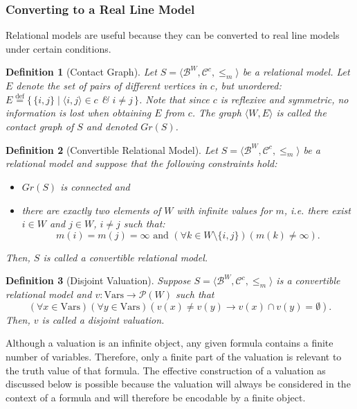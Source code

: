 \documentclass{article}
\newtheorem*{definition}{Definition}
\newcommand{\pwrset}{\mathcal{P}}
\newcommand{\B}{\mathcal{B}}
\newcommand{\Vars}{\text{Vars}}
\newcommand{\eqdef}{\stackrel{\text{def}}{=}}
\begin{document}
\subsubsection{Converting to a Real Line Model}
Relational models are useful because they can be converted to real line models under certain conditions.
\begin{definition}[Contact Graph]
  Let $S = \langle \B^W, \mathcal{C}^c, \leq_m \rangle$ be a relational model. Let $E$ denote the set of pairs of different vertices in $c$, but unordered: $E \eqdef \{\, \{i, j\} \mid \langle i, j \rangle \in c$ \& $i \neq j \,\}$. Note that since $c$ is reflexive and symmetric, no information is lost when obtaining $E$ from $c$.
  The graph $\langle W, E \rangle$ is called the \emph{contact graph of $S$} and denoted $Gr(S)$.
\end{definition}
\begin{definition}[Convertible Relational Model]
Let $S = \langle \B^W, \mathcal{C}^c, \leq_m \rangle$ be a relational model and suppose that the following constraints hold:
\begin{itemize}
\item $Gr(S)$ is connected and
\item there are exactly two elements of $W$ with infinite values for $m$, i.e. there exist $i \in W$ and $j \in W$, $i \neq j$ such that:
  \begin{equation*}
    m(i) = m(j) = \infty \text{ and } (\forall k \in W \setminus \{i, j\})(m(k) \neq \infty).
  \end{equation*}
\end{itemize}
Then, $S$ is called a \emph{convertible relational model}.
\end{definition}

\begin{definition}[Disjoint Valuation]
  Suppose $S = \langle \B^W, \mathcal{C}^c, \leq_m \rangle$ is a convertible relational model and $v: \Vars \rightarrow \pwrset(W)$ such that
\begin{equation*}
(\forall x \in \Vars)(\forall y \in \Vars)(v(x) \neq v(y) \rightarrow v(x) \cap v(y) = \emptyset).
\end{equation*}
Then, $v$ is called a \emph{disjoint valuation}.
\end{definition}

Although a valuation is an infinite object, any given formula contains a finite number of variables. Therefore, only a finite part of the valuation is relevant to the truth value of that formula. The effective construction of a valuation as discussed below is possible because the valuation will always be considered in the context of a formula and will therefore be encodable by a finite object.
\end{document}
